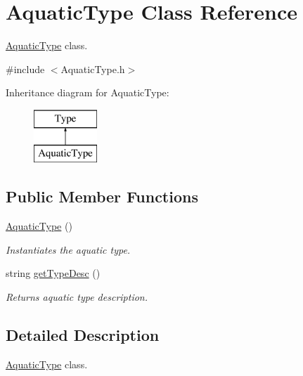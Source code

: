\hypertarget{classAquaticType}{}\section{Aquatic\+Type Class Reference}
\label{classAquaticType}


\hyperlink{classAquaticType}{Aquatic\+Type} class.  




{\ttfamily \#include $<$Aquatic\+Type.\+h$>$}

Inheritance diagram for Aquatic\+Type\+:\begin{figure}[H]
\begin{center}
\leavevmode
\includegraphics[height=2.000000cm]{classAquaticType}
\end{center}
\end{figure}
\subsection*{Public Member Functions}
\begin{DoxyCompactItemize}
\item 
\mbox{\label{classAquaticType_a2e9287ecb48a58ca5d8fd560da4d9d57}} 
\hyperlink{classAquaticType_a2e9287ecb48a58ca5d8fd560da4d9d57}{Aquatic\+Type} ()
\begin{DoxyCompactList}\small\item\em Instantiates the aquatic type. \end{DoxyCompactList}\item 
string \hyperlink{classAquaticType_abb1b9ebdb96a352e0287f7a7cb803eab}{get\+Type\+Desc} ()
\begin{DoxyCompactList}\small\item\em Returns aquatic type description. \end{DoxyCompactList}\end{DoxyCompactItemize}


\subsection{Detailed Description}
\hyperlink{classAquaticType}{Aquatic\+Type} class. 

